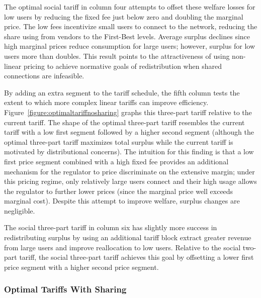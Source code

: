 \documentclass[12pt]{article}
\begin{document}
The optimal social tariff in column four attempts to offset these welfare losses for low users by reducing the fixed fee just below zero and doubling the marginal price.  The low fees incentivize small users to connect to the network, reducing the share using from vendors to the First-Best levels.  Average surplus declines since high marginal prices reduce consumption for large users; however, surplus for low users more than doubles.  This result points to the attractiveness of using non-linear pricing to achieve normative goals of redistribution when shared connections are infeasible.

By adding an extra segment to the tariff schedule, the fifth column tests the extent to which more complex linear tariffs can improve efficiency.  Figure~\ref{figure:optimaltariffnosharing} graphs this three-part tariff relative to the current tariff.  The shape of the optimal three-part tariff resembles the current tariff with a low first segment followed by a higher second segment (although the optimal three-part tariff maximizes total surplus while the current tariff is motivated by distributional concerns).  The intuition for this finding is that a low first price segment combined with a high fixed fee provides an additional mechanism for the regulator to price discriminate on the extensive margin; under this pricing regime, only relatively large users connect and their high usage allows the regulator to further lower prices (since the marginal price well exceeds marginal cost).  Despite this attempt to improve welfare, surplus changes are negligible.  

The social three-part tariff in column six has slightly more success in redistributing surplus by using an additional tariff block extract greater revenue from large users and improve reallocation to low users.  Relative to the social two-part tariff, the social three-part tariff achieves this goal by offsetting a lower first price segment with a higher second price segment.  


\subsubsection{Optimal Tariffs With Sharing}\label{section:optimaltariffswithsharing}
\end{document}
